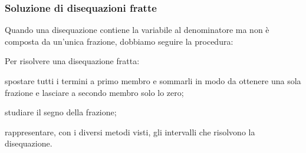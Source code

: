\subsubsection{Soluzione di disequazioni fratte}

Quando una disequazione contiene la variabile al denominatore ma non è 
composta da un'unica frazione, dobbiamo seguire la procedura:

\begin{procedura}{}{}
 Per risolvere una disequazione fratta:
\begin{enumeratea}
 \item spostare tutti i termini a primo membro e sommarli in modo da ottenere 
 una sola frazione e lasciare a secondo membro solo lo zero;
 \item studiare il segno della frazione;
 \item rappresentare, con i diversi metodi visti, 
  gli intervalli che risolvono la disequazione.
\end{enumeratea}
\end{procedura}

